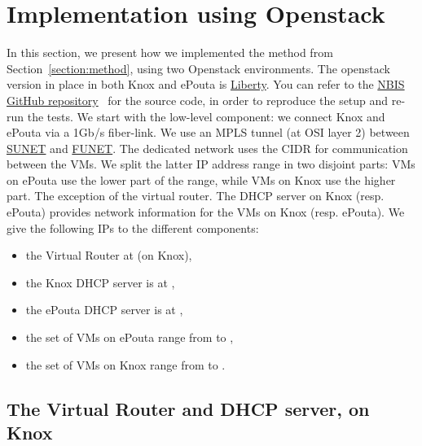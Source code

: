 \section{Implementation using Openstack}
\label{section:implementation}

In this section, we present how we implemented the method from
Section~\ref{section:method}, using two Openstack environments.
%
The openstack version in place in both Knox and ePouta is
\href{http://docs.openstack.org/liberty/install-guide-ubuntu/}{Liberty}.
%
%
You can refer to the
\href{https://github.com/NBISweden/Knox-ePouta}{NBIS GitHub
  repository}~\cite{nbis-knox-epouta} for the source code, in order to
reproduce the setup and re-run the tests.
%
We start with the low-level component: we connect Knox
and ePouta via a 1Gb/s fiber-link.
%
We use an MPLS tunnel (at OSI layer 2) between
\href{https://www.sunet.se/}{SUNET} and
\href{https://www.csc.fi/funet-network-services}{FUNET}.
%
The dedicated network uses the  CIDR for communication
between the VMs.
%
We split the latter IP address range in two disjoint parts: VMs on
ePouta use the lower part of the range, while VMs on Knox use the
higher part. The exception of the virtual router.
%
The DHCP server on Knox (resp. ePouta) provides network information
for the VMs on Knox (resp. ePouta).
%
We give the following IPs to the different components:
%
\begin{itemize}
\item the Virtual Router at  (on Knox),
\item the Knox DHCP server is at ,
\item the ePouta DHCP server is at ,
\item the set of VMs on ePouta range from  to ,%
\item the set of VMs on Knox range from  to .
\end{itemize}

\subsection{The Virtual Router and DHCP server, on Knox}
\label{section:implementation:virtual:router}
\label{section:implementation:dhcp:server:knox}

